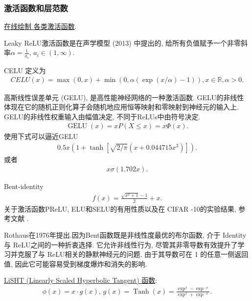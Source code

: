 \subsubsection{激活函数和层范数}
\href{https://dashee87.github.io/deep\%20learning/visualising-activation-functions-in-neural-networks/}{在线绘制 各类激活函数}.
\begin{remark}
Leaky ReLU激活函数是在声学模型 (2013) 中提出的, 给所有负值赋予一个非零斜率$\alpha=\frac 1 {a_i},\, a_i\in (1,\infty)$.
\end{remark}
\begin{remark}
    CELU \cite{hendrycks2016gelu} 定义为
\begin{align}
    CELU (x)=\max (0,x)+\min (0,\alpha (\exp (x/\alpha)-1)), x\in \mathbb R, \alpha> 0.
\end{align}
\end{remark}
\begin{remark}
    高斯线性误差单元 (GELU), 是高性能神经网络的一种激活函数. GELU的非线性体现在它的随机正则化算子会随机地应用恒等映射和零映射到神经元的输入上.
GELU的非线性权重输入由幅值决定, 不同于ReLUs中由符号决定.
\begin{align}
    \operatorname{GELU} (x)=x P (X \leq x)=x \Phi (x).
\end{align}
使用下式可以逼近GELU
\begin{align}
    0.5 x\left (1+\tanh \left[\sqrt{2 / \pi}\left (x+0.044715 x^{3}\right)\right]\right).
\end{align}
或者
\begin{align}
    x \sigma (1.702 x).
\end{align}
\end{remark}

Bent-identity 
\begin{align}
    f (x) = \frac{\sqrt{x^2 + 1} - 1}{2} +x.
\end{align}
关于激活函数PReLU, ELU和SELU的有用性质以及在 CIFAR -10的实验结果, 参考文献 \cite{Godfrey2019-9846}.

Rothaus在1976年提出.因为Bent函数既是非线性度最优的布尔函数, 介于 Identity 与 ReLU之间的一种折衷选择. 它允许非线性行为, 尽管其非零导数有效提升了学习并克服了与 ReLU相关的静默神经元的问题.
由于其导数可在 1 的任意一侧返回值, 因此它可能容易受到梯度爆炸和消失的影响.

\href{https://arxiv.org/pdf/1901.05894.pdf}{LiSHT (Linearly Scaled Hyperbolic Tangent) 函数}:
\begin{align}
    \phi (x)=x \cdot g (x),\, g (x)=\operatorname{Tanh} (x)=\frac{\exp ^{x}-\exp ^{-x}}{\exp ^{x}+\exp ^{-x}}.
\end{align}

